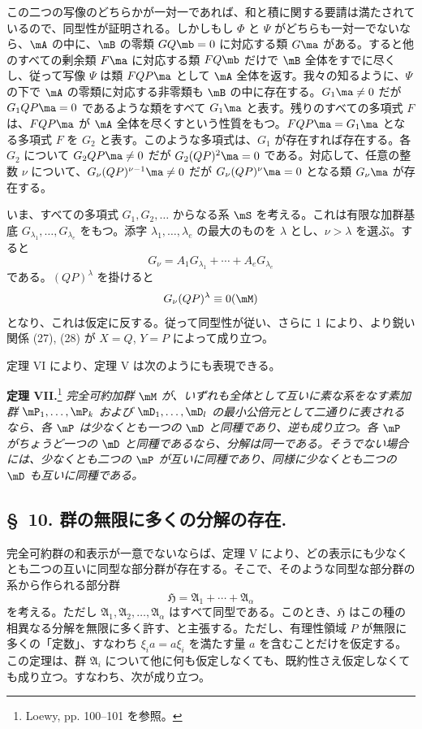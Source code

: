 \documentclass[11pt]{article}
\begin{document}
この二つの写像のどちらかが一対一であれば、和と積に関する要請は満たされているので、同型性が証明される。しかしもし $\Phi$ と $\Psi$ がどちらも一対一でないなら、$\mA$ の中に、$\mB$ の零類 $GQ\mb=0$ に対応する類 $G\ma$ がある。すると他のすべての剰余類 $F\ma$ に対応する類 $FQ\mb$ だけで $\mB$ 全体をすでに尽くし、従って写像 $\Psi$ は類 $FQP\ma$ として $\mA$ 全体を返す。我々の知るように、$\Psi$ の下で $\mA$ の零類に対応する非零類も $\mB$ の中に存在する。$G_1\ma\ne0$ だが $G_1QP\ma=0$ であるような類をすべて $G_1\ma$ と表す。残りのすべての多項式 $F$ は、$FQP\ma$ が $\mA$ 全体を尽くすという性質をもつ。$FQP\ma=G_1\ma$ となる多項式 $F$ を $G_2$ と表す。このような多項式は、$G_1$ が存在すれば存在する。各 $G_2$ について $G_2QP\ma\ne0$ だが $G_2(QP)^2\ma=0$ である。対応して、任意の整数 $\nu$ について、$G_\nu(QP)^{\nu-1}\ma\ne0$ だが $G_\nu(QP)^\nu\ma=0$ となる類 $G_\nu\ma$ が存在する。

いま、すべての多項式 $G_1,G_2,
\ldots$ からなる系 $\mS$ を考える。これは有限な加群基底 $G_{\lambda_1},\ldots,G_{\lambda_e}$ をもつ。添字 $\lambda_1,
\ldots,\lambda_e$ の最大のものを $\lambda$ とし、$\nu>\lambda$ を選ぶ。すると
\[
 G_\nu=A_1G_{\lambda_1}+\cdots+A_eG_{\lambda_e}
\]
である。$(QP)^\lambda$ を掛けると
\[
 G_\nu(QP)^\lambda\equiv0(\mM)
\]
となり、これは仮定に反する。従って同型性が従い、さらに 1 により、より鋭い関係 (27), (28) が $X=Q$, $Y=P$ によって成り立つ。

定理 VI により、定理 V は次のようにも表現できる。

\textbf{定理 VII.}\footnote{Loewy, pp. 100--101 を参照。} \emph{完全可約加群 $\mM$ が、いずれも全体として互いに素な系をなす素加群 $\mP_1,
\ldots,\mP_k$ および $\mD_1,
\ldots,\mD_l$ の最小公倍元として二通りに表されるなら、各 $\mP$ は少なくとも一つの $\mD$ と同種であり、逆も成り立つ。各 $\mP$ がちょうど一つの $\mD$ と同種であるなら、分解は同一である。そうでない場合には、少なくとも二つの $\mP$ が互いに同種であり、同様に少なくとも二つの $\mD$ も互いに同種である。}

\setcounter{footnote}{19}
\subsection*{\S~10. 群の無限に多くの分解の存在.}

完全可約群の和表示が一意でないならば、定理 V により、どの表示にも少なくとも二つの互いに同型な部分群が存在する。そこで、そのような同型な部分群の系から作られる部分群
\[
  \mathfrak H=\mathfrak A_1+\cdots+\mathfrak A_\alpha
\]
を考える。ただし $\mathfrak A_1,\mathfrak A_2,\ldots,\mathfrak A_\alpha$ はすべて同型である。このとき、$\mathfrak H$ はこの種の相異なる分解を無限に多く許す、と主張する。ただし、有理性領域 $P$ が無限に多くの「定数」、すなわち $\xi_i a=a\xi_i$ を満たす量 $a$ を含むことだけを仮定する。この定理は、群 $\mathfrak A_i$ について他に何も仮定しなくても、既約性さえ仮定しなくても成り立つ。すなわち、次が成り立つ。
\end{document}
